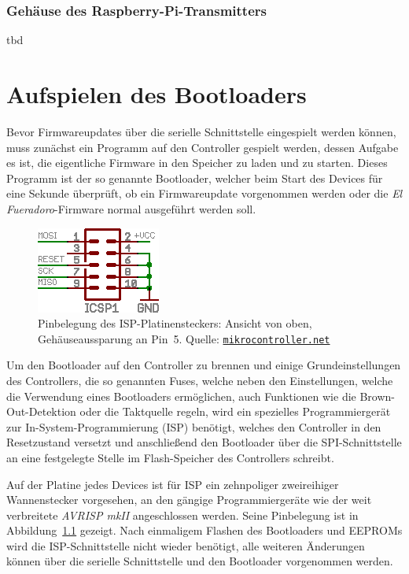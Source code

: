 \documentclass[paper=a4, parskip, numbers=noenddot, toc=listof, headsepline]{scrbook}
\newcommand{\anlage}{\emph{El Fueradoro}}
\begin{document}
		  \subsection{Gehäuse des Raspberry-Pi-Transmitters}

			  tbd

		\chapter{Aufspielen des Bootloaders}
		 \label{ch:bootloader}

		 Bevor Firmwareupdates über die serielle Schnittstelle eingespielt werden können, muss zunächst ein Programm auf den Controller gespielt werden, dessen Aufgabe es ist, die eigentliche Firmware in den Speicher zu laden und zu starten. Dieses Programm ist der so genannte Bootloader, welcher beim Start des Devices für eine Sekunde überprüft, ob ein Firmwareupdate vorgenommen werden oder die {\anlage}-Firmware normal ausgeführt werden soll.

		 \begin{figure}[!h]
			 \centering
			 \includegraphics[width=.35\textwidth]{Bilder/isp}
			 \caption{Pinbelegung des ISP-Platinensteckers: Ansicht von oben, Gehäuseaussparung an Pin~5. Quelle: \href{http://www.mikrocontroller.net}{\texttt{mikrocontroller.net}}}
			 \label{fig:isp}
		 \end{figure}

		 Um den Bootloader auf den Controller zu brennen und einige Grundeinstellungen des Controllers, die so genannten Fuses, welche neben den Einstellungen, welche die Verwendung eines Bootloaders ermöglichen, auch Funktionen wie die Brown-Out-Detektion oder die Taktquelle regeln, wird ein spezielles Programmiergerät zur In-System-Programmierung (ISP) benötigt, welches den Controller in den Resetzustand versetzt und anschließend den Bootloader über die SPI-Schnittstelle an eine festgelegte Stelle im Flash-Speicher des Controllers schreibt.

		 Auf der Platine jedes Devices ist für ISP ein zehnpoliger zweireihiger Wannenstecker vorgesehen, an den gängige Programmiergeräte wie der weit verbreitete \emph{AVRISP mkII} angeschlossen werden. Seine Pinbelegung ist in Abbildung~\ref{fig:isp} gezeigt. Nach einmaligem Flashen des Bootloaders und EEPROMs wird die ISP-Schnittstelle nicht wieder benötigt, alle weiteren Änderungen können über die serielle Schnittstelle und den Bootloader vorgenommen werden.
\end{document}

